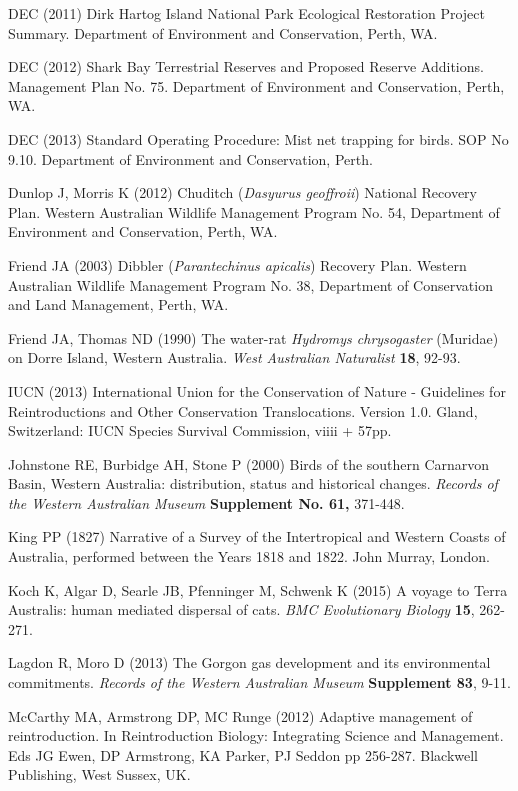 \documentclass[version=last,
    paper=a4,                               %
    10pt,                                   %
    dvipsnames,
    oneside,                              %
    headings=openany,                       %
    open=any,
    BCOR=7mm,                               %
    DIV=15,     %
]{scrbook}
\begin{document}
DEC (2011) Dirk Hartog Island National Park Ecological Restoration
Project Summary. Department of Environment and Conservation, Perth, WA.

DEC (2012) Shark Bay Terrestrial Reserves and Proposed Reserve
Additions. Management Plan No. 75. Department of Environment and
Conservation, Perth, WA.

DEC (2013) Standard Operating Procedure: Mist net trapping for birds.
SOP No 9.10. Department of Environment and Conservation, Perth.

Dunlop J, Morris K (2012) Chuditch (\emph{Dasyurus geoffroii}) National
Recovery Plan. Western Australian Wildlife Management Program No. 54,
Department of Environment and Conservation, Perth, WA.

Friend JA (2003) Dibbler (\emph{Parantechinus apicalis}) Recovery Plan.
Western Australian Wildlife Management Program No. 38, Department of
Conservation and Land Management, Perth, WA.

Friend JA, Thomas ND (1990) The water-rat \emph{Hydromys chrysogaster}
(Muridae) on Dorre Island, Western Australia. \emph{West Australian
Naturalist} \textbf{18}, 92-93.

IUCN (2013) International Union for the Conservation of Nature -
Guidelines for Reintroductions and Other Conservation Translocations.
Version 1.0. Gland, Switzerland: IUCN Species Survival Commission, viiii
+ 57pp.

Johnstone RE, Burbidge AH, Stone P (2000) Birds of the southern
Carnarvon Basin, Western Australia: distribution, status and historical
changes. \emph{Records of the Western Australian Museum}
\textbf{Supplement No. 61,} 371-448.

King PP (1827) Narrative of a Survey of the Intertropical and Western
Coasts of Australia, performed between the Years 1818 and 1822. John
Murray, London.

Koch K, Algar D, Searle JB, Pfenninger M, Schwenk K (2015) A voyage to
Terra Australis: human mediated dispersal of cats. \emph{BMC
Evolutionary Biology} \textbf{15}, 262-271.

Lagdon R, Moro D (2013) The Gorgon gas development and its environmental
commitments. \emph{Records of the Western Australian Museum}
\textbf{Supplement 83}, 9-11.

McCarthy MA, Armstrong DP, MC Runge (2012) Adaptive management of
reintroduction. In Reintroduction Biology: Integrating Science and
Management. Eds JG Ewen, DP Armstrong, KA Parker, PJ Seddon pp 256-287.
Blackwell Publishing, West Sussex, UK.
\end{document}
